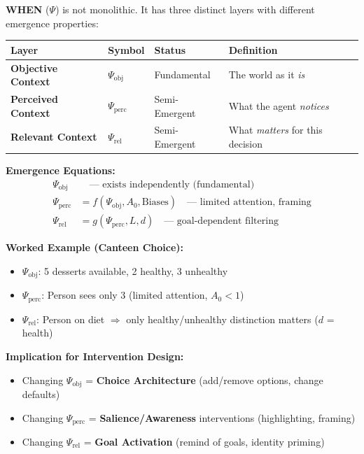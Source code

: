 
\begin{tcolorbox}[colback=yellow!5!white, colframe=yellow!75!black,
    title=\textbf{Refinement: The Three Layers of Context ($\Psi$)}]

\textbf{WHEN} ($\Psi$) is not monolithic. It has three distinct layers with different emergence properties:

\begin{center}
\renewcommand{\arraystretch}{1.3}
\begin{tabular}{@{}llll@{}}
\toprule
\textbf{Layer} & \textbf{Symbol} & \textbf{Status} & \textbf{Definition} \\
\midrule
\textbf{Objective Context} & $\Psi_{\text{obj}}$ & Fundamental & The world as it \textit{is} \\
\textbf{Perceived Context} & $\Psi_{\text{perc}}$ & Semi-Emergent & What the agent \textit{notices} \\
\textbf{Relevant Context} & $\Psi_{\text{rel}}$ & Semi-Emergent & What \textit{matters} for this decision \\
\bottomrule
\end{tabular}
\end{center}

\textbf{Emergence Equations:}
\begin{align}
\Psi_{\text{obj}} &\quad \text{--- exists independently (fundamental)} \\
\Psi_{\text{perc}} &= f(\Psi_{\text{obj}}, A_0, \text{Biases}) \quad \text{--- limited attention, framing} \\
\Psi_{\text{rel}} &= g(\Psi_{\text{perc}}, L, d) \quad \text{--- goal-dependent filtering}
\end{align}

\textbf{Worked Example (Canteen Choice):}
\begin{itemize}[nosep]
    \item $\Psi_{\text{obj}}$: 5 desserts available, 2 healthy, 3 unhealthy
    \item $\Psi_{\text{perc}}$: Person sees only 3 (limited attention, $A_0 < 1$)
    \item $\Psi_{\text{rel}}$: Person on diet $\Rightarrow$ only healthy/unhealthy distinction matters ($d$ = health)
\end{itemize}

\textbf{Implication for Intervention Design:}
\begin{itemize}[nosep]
    \item Changing $\Psi_{\text{obj}}$ = \textbf{Choice Architecture} (add/remove options, change defaults)
    \item Changing $\Psi_{\text{perc}}$ = \textbf{Salience/Awareness} interventions (highlighting, framing)
    \item Changing $\Psi_{\text{rel}}$ = \textbf{Goal Activation} (remind of goals, identity priming)
\end{itemize}

\end{tcolorbox}


